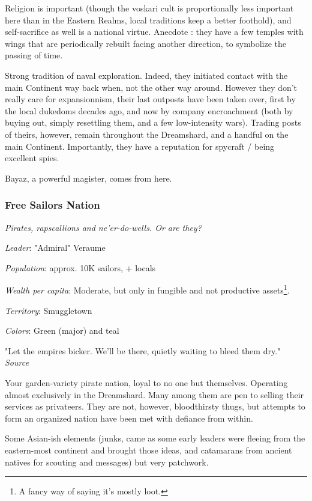 Religion is important (though the voskari cult is proportionally less important here than in the Eastern Realms, local traditions keep a better foothold), and self-sacrifice as well is a national virtue. Anecdote : they have a few temples with wings that are periodically rebuilt facing another direction, to symbolize the passing of time.

Strong tradition of naval exploration. Indeed, they initiated contact with the main Continent way back when, not the other way around. However they don't really care for expansionnism, their last outposts have been taken over, first by the local dukedoms decades ago, and now by company encroachment (both by buying out, simply resettling them, and a few low-intensity wars). Trading posts of theirs, however, remain throughout the Dreamshard, and a handful on the main Continent. Importantly, they have a reputation for spycraft / being excellent spies.

Bayaz, a powerful magister, comes from here.


\subsubsection{Free Sailors Nation}

\textit{Pirates, rapscallions and ne'er-do-wells. Or are they?}

\textit{Leader}: "Admiral" Veraume

\textit{Population}: approx. 10K sailors, + locals

\textit{Wealth per capita}: Moderate, but only in fungible and not productive assets\footnote{A fancy way of saying it's mostly loot.}.

\textit{Territory}: Smuggletown
    
\textit{Colors}: Green (major) and teal

\begin{rpg-quotebox}
    "Let the empires bicker. We'll be there, quietly waiting to bleed them dry." \\ \textendash \textit{Source}
\end{rpg-quotebox}

Your garden-variety pirate nation, loyal to no one but themselves. Operating almost exclusively in the Dreamshard. Many among them are pen to selling their services as privateers. They are not, however, bloodthirsty thugs, but attempts to form an organized nation have been met with defiance from within.

Some Asian-ish elements (junks, came as some early leaders were fleeing from the eastern-most continent and brought those ideas, and catamarans from ancient natives for scouting and messages) but very patchwork. 
	
